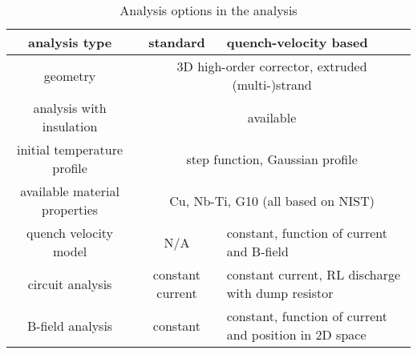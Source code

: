 \begin{table}[H]
    \caption{Analysis options in the analysis} 
    \vspace{-1.em} 
    \fontsize{10}{10}
    \selectfont 
    \renewcommand{\arraystretch}{1.5}
    \begin{center}
        \begin{tabular}{ c | c | m{5cm} }  
        \hline
        \textbf{analysis type} & \textbf{standard} & \textbf{quench-velocity based} \\
        \hline
        geometry & \multicolumn{2}{c}{3D high-order corrector,  extruded (multi-)strand} \\
        \hline
        analysis with insulation & \multicolumn{2}{c}{available} \\
        \hline
        initial temperature profile & \multicolumn{2}{c}{step function, Gaussian profile} \\
        \hline
        available material properties & \multicolumn{2}{c}{Cu, Nb-Ti, G10 (all based on NIST)} \\
        \hline
        quench velocity model & N/A & constant, function of current and B-field \\
        \hline
        circuit analysis & constant current & constant current, RL discharge with dump resistor \\ 
        \hline
        B-field analysis & constant & constant, function of current and position in 2D space
        \end{tabular}
    \end{center}  
     \label{table:python_analysis_options} 
 \end{table}







